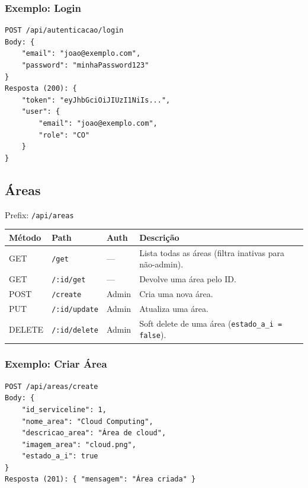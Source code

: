 \documentclass[12pt,a4paper]{article}
\begin{document}
\subsubsection*{Exemplo: Login}
\begin{lstlisting}
POST /api/autenticacao/login
Body: {
    "email": "joao@exemplo.com",
    "password": "minhaPassword123"
}
Resposta (200): {
    "token": "eyJhbGciOiJIUzI1NiIs...",
    "user": {
        "email": "joao@exemplo.com",
        "role": "CO"
    }
}
\end{lstlisting}

\subsection{Áreas}
\label{sec:areas}

Prefix: \texttt{/api/areas}

\begin{longtable}{@{}lllp{6cm}@{}}
    \toprule
    \textbf{Método} & \textbf{Path} & \textbf{Auth} & \textbf{Descrição} \\
    \midrule
    \endhead
    \bottomrule
    \endfoot

    GET    & \texttt{/get} & --- & Lista todas as áreas (filtra inativas para não-admin). \\
    GET    & \texttt{/:id/get} & --- & Devolve uma área pelo ID. \\
    POST   & \texttt{/create} & Admin & Cria uma nova área. \\
    PUT    & \texttt{/:id/update} & Admin & Atualiza uma área. \\
    DELETE & \texttt{/:id/delete} & Admin & Soft delete de uma área (\texttt{estado\_a\_i = false}). \\
\end{longtable}

\subsubsection*{Exemplo: Criar Área}
\begin{lstlisting}
POST /api/areas/create
Body: {
    "id_serviceline": 1,
    "nome_area": "Cloud Computing",
    "descricao_area": "Área de cloud",
    "imagem_area": "cloud.png",
    "estado_a_i": true
}
Resposta (201): { "mensagem": "Área criada" }
\end{lstlisting}
\end{document}

